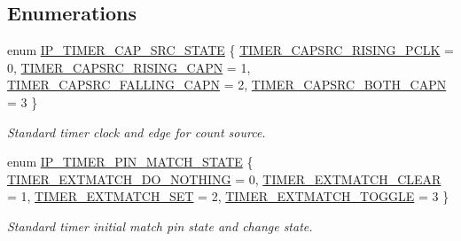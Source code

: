 \subsection*{Enumerations}
\begin{DoxyCompactItemize}
\item 
enum \hyperlink{group__TIMER__17XX__40XX_ga1ceafbd6fb46418e292878934efb63aa}{I\+P\+\_\+\+T\+I\+M\+E\+R\+\_\+\+C\+A\+P\+\_\+\+S\+R\+C\+\_\+\+S\+T\+A\+TE} \{ \hyperlink{group__TIMER__17XX__40XX_gga1ceafbd6fb46418e292878934efb63aaa9c110041557616b65aff5c20d03ae8be}{T\+I\+M\+E\+R\+\_\+\+C\+A\+P\+S\+R\+C\+\_\+\+R\+I\+S\+I\+N\+G\+\_\+\+P\+C\+LK} = 0, 
\hyperlink{group__TIMER__17XX__40XX_gga1ceafbd6fb46418e292878934efb63aaae17c344c6e80cc8f2a0e6f5c4bc32269}{T\+I\+M\+E\+R\+\_\+\+C\+A\+P\+S\+R\+C\+\_\+\+R\+I\+S\+I\+N\+G\+\_\+\+C\+A\+PN} = 1, 
\hyperlink{group__TIMER__17XX__40XX_gga1ceafbd6fb46418e292878934efb63aaaf07e78a49ce7829f3a7975196aeb5a5c}{T\+I\+M\+E\+R\+\_\+\+C\+A\+P\+S\+R\+C\+\_\+\+F\+A\+L\+L\+I\+N\+G\+\_\+\+C\+A\+PN} = 2, 
\hyperlink{group__TIMER__17XX__40XX_gga1ceafbd6fb46418e292878934efb63aaaa09ba96751f9c750f9257050053ccb62}{T\+I\+M\+E\+R\+\_\+\+C\+A\+P\+S\+R\+C\+\_\+\+B\+O\+T\+H\+\_\+\+C\+A\+PN} = 3
 \}\begin{DoxyCompactList}\small\item\em Standard timer clock and edge for count source. \end{DoxyCompactList}
\item 
enum \hyperlink{group__TIMER__17XX__40XX_ga29caa12f43ff996d3ebbf7d5f9036f2c}{I\+P\+\_\+\+T\+I\+M\+E\+R\+\_\+\+P\+I\+N\+\_\+\+M\+A\+T\+C\+H\+\_\+\+S\+T\+A\+TE} \{ \hyperlink{group__TIMER__17XX__40XX_gga29caa12f43ff996d3ebbf7d5f9036f2caee61101edb52ea5ce70b74a41766467f}{T\+I\+M\+E\+R\+\_\+\+E\+X\+T\+M\+A\+T\+C\+H\+\_\+\+D\+O\+\_\+\+N\+O\+T\+H\+I\+NG} = 0, 
\hyperlink{group__TIMER__17XX__40XX_gga29caa12f43ff996d3ebbf7d5f9036f2ca0fc4886f55eb7bcfda4baea4c08c551a}{T\+I\+M\+E\+R\+\_\+\+E\+X\+T\+M\+A\+T\+C\+H\+\_\+\+C\+L\+E\+AR} = 1, 
\hyperlink{group__TIMER__17XX__40XX_gga29caa12f43ff996d3ebbf7d5f9036f2ca059e5dedfdab474ecafba9827116f5ff}{T\+I\+M\+E\+R\+\_\+\+E\+X\+T\+M\+A\+T\+C\+H\+\_\+\+S\+ET} = 2, 
\hyperlink{group__TIMER__17XX__40XX_gga29caa12f43ff996d3ebbf7d5f9036f2caa7b4fdd349721213351a4bba29472215}{T\+I\+M\+E\+R\+\_\+\+E\+X\+T\+M\+A\+T\+C\+H\+\_\+\+T\+O\+G\+G\+LE} = 3
 \}\begin{DoxyCompactList}\small\item\em Standard timer initial match pin state and change state. \end{DoxyCompactList}
\end{DoxyCompactItemize}
